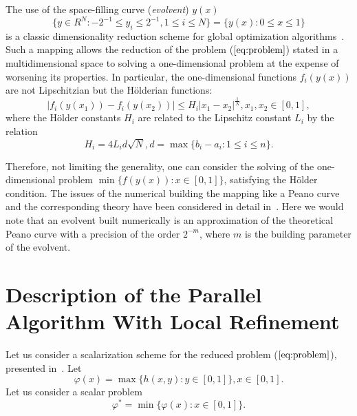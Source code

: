 \documentclass{llncs}
\begin{document}
The use of the space-filling curve (\textit{evolvent}) \(y(x)\)
\begin{displaymath}
\label{cube}
\lbrace y\in R^N:-2^{-1}\leqslant y_i\leqslant 2^{-1},1\leqslant i\leqslant
N\rbrace=\{y(x):0\leqslant x\leqslant 1\}
\end{displaymath}
is a classic dimensionality reduction scheme for global optimization algorithms~\cite{evolvents2013}.
Such a mapping allows the reduction of the problem (\(\ref{eq:problem}\)) stated in a
multidimensional space to solving a one-dimensional problem at the expense of worsening its
properties.
In particular, the one-dimensional functions \(f_i(y(x))\) are not Lipschitzian but the
H\"olderian functions:
\begin{equation}
\label{eq:holder}
|f_i(y(x_1))-f_i(y(x_2))|\leqslant H_i{|x_1-x_2|}^{\frac{1}{N}},x_1,x_2\in[0,1],
\end{equation}
where the H\"older constants \(H_i\) are related to the Lipschitz constant \(L_i\) by the relation
\begin{displaymath}
H_i=4L_id\sqrt{N},d=\max\{b_i-a_i:1\leqslant i\leqslant n\}.
\end{displaymath}
\par
Therefore, not limiting the generality, one can consider the solving of the
one-dimensional problem \(\min\{f(y(x)): x\in [0,1]\}\), satisfying the H\"older condition. The
issues of the numerical building the mapping like a Peano curve and the corresponding theory
have been considered in detail in~\cite{evolvents2013}. Here we would note that an evolvent
built numerically is an approximation of the theoretical Peano curve with a precision of the
order \(2^{-m}\), where \(m\) is the building parameter of the evolvent.

\section{Description of the Parallel Algorithm With Local Refinement}
\label{sec:algorithm}
Let us consider a scalarization scheme for the reduced problem (\(\ref{eq:problem}\)),
presented in~\cite{markinStrongin1993}. Let
\begin{equation}
  \varphi(x)=\max\{h(x,y):y\in [0,1]\},x\in [0,1].
\end{equation}
Let us consider a scalar problem
\begin{equation}
  \label{eq:aux_problem}
  \varphi^*=\min\{\varphi(x):x\in [0,1]\}.
\end{equation}
\end{document}
